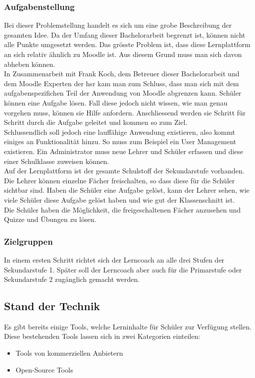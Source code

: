 \subsubsection{Aufgabenstellung}
Bei dieser Problemstellung handelt es sich um eine grobe Beschreibung der gesamten Idee. Da der Umfang dieser Bachelorarbeit begrenzt ist, können nicht alle Punkte umgesetzt werden. Das grösste Problem ist, dass diese Lernplattform an sich relativ ähnlich zu Moodle ist. Aus diesem Grund muss man sich davon abheben können.
\\
In Zusammenarbeit mit Frank Koch, dem Betreuer dieser Bachelorarbeit und dem Moodle Experten der \gls{hsr} kam man zum Schluss, dass man sich mit dem aufgabenspezifichen Teil der Anwendung von Moodle abgrenzen kann. Schüler können eine Aufgabe lösen. Fall diese jedoch nicht wissen, wie man genau vorgehen muss, können sie Hilfe anfordern. Anschliessend werden sie Schritt für Schritt durch die Aufgabe geleitet und kommen so zum Ziel.
\\
Schlussendlich soll jedoch eine lauffähige Anwendung existieren, also kommt einiges an Funktionalität hinzu. So muss zum Beispiel ein User Management existieren. Ein Administrator muss neue Lehrer und Schüler erfassen und diese einer Schulklasse zuweisen können.
\\
Auf der Lernplattform ist der gesamte Schulstoff der Sekundarstufe vorhanden. Die Lehrer können einzelne Fächer freischalten, so dass diese für die Schüler sichtbar sind. Haben die Schüler eine Aufgabe gelöst, kann der Lehrer sehen, wie viele Schüler diese Aufgabe gelöst haben und wie gut der Klassenschnitt ist.
\\
Die Schüler haben die Möglichkeit, die freigeschaltenen Fächer anzusehen und Quizze und Übungen zu lösen.

\subsubsection{Zielgruppen}
In einem ersten Schritt richtet sich der Lerncoach an alle drei Stufen der Sekundarstufe 1. Später soll der Lerncoach aber auch für die Primarstufe oder Sekundarstufe 2 zugänglich gemacht werden. 

\subsection{Stand der Technik}
Es gibt bereits einige Tools, welche Lerninhalte für Schüler zur Verfügung stellen. Diese bestehenden Tools lassen sich in zwei Kategorien einteilen:
\begin{itemize}
	\item Tools von kommerziellen Anbietern
	\item Open-Source Tools
\end{itemize}

